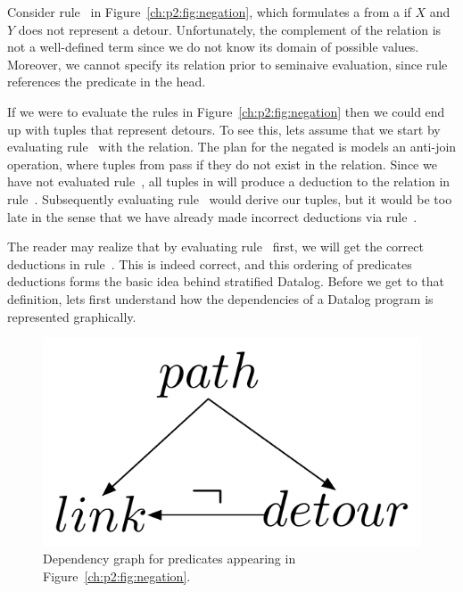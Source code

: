 Consider rule~ in Figure~\ref{ch:p2:fig:negation}, which formulates a
 from a  if $X$ and $Y$ does not represent a detour.
Unfortunately, the complement of the  relation is not a well-defined
term since we do not know its domain of possible values.  Moreover, we cannot
specify its relation prior to seminaive evaluation, since rule~
references the  predicate in the head.  

If we were to evaluate the rules in Figure~\ref{ch:p2:fig:negation}
then we could end up with  tuples that represent
detours. To see this, lets assume that we start by evaluating rule~
with the  relation. The plan for the negated  is models
an anti-join operation, where tuples from  pass if they do not exist
in the  relation. Since we have not evaluated rule~,
all tuples in  will produce a deduction to the  relation
in rule~. Subsequently evaluating rule~ would derive our
 tuples, but it would be too late in the sense that we have already
made incorrect deductions via rule~.

The reader may realize that by evaluating rule~ first, we will get the
correct deductions in rule~.  This is indeed correct, and this ordering
of predicates deductions forms the basic idea behind stratified Datalog.
Before we get to that definition, lets first understand how the dependencies of
a Datalog program is represented graphically.

\begin{figure} 
\ssp
\begin{center}
\includegraphics[scale=1]{figures/dependency-graph}
\caption{\label{ch:p2:fig:dependency}Dependency graph for predicates 
appearing in Figure~\ref{ch:p2:fig:negation}.}
\end{center} 
\end{figure}

